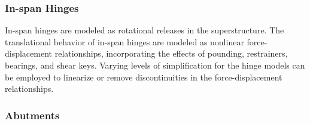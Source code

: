 \subsubsection*{In-span Hinges}
In-span hinges are modeled as rotational releases in the superstructure. The translational behavior of in-span hinges are modeled as nonlinear force-displacement relationships, incorporating the effects of pounding, restrainers, bearings, and shear keys. Varying levels of simplification for the hinge models can be employed to linearize or remove discontinuities in the force-displacement relationships.

\subsubsection*{Abutments}
%



